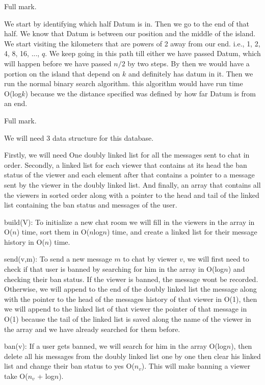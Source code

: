 \documentclass[12pt,twoside]{article}
\begin{document}
\begin{problems}
\begin{problemparts}
\end{problemparts}
\newpage
\problem  %
Full mark.

 We start by identifying which half Datum is in. Then we go to the end of that half. We know that Datum is between our position and the middle of the island. We start visiting the kilometers that are powers of 2 away from our end. i.e., {1, 2, 4, 8, 16, ..., $q$}. We keep going in this path till either we have passed Datum, which will happen before we have passed $n/2$ by two steps. By then we would have a portion on the island that depend on $k$ and definitely has datum in it. Then we run the normal binary search algorithm. this algorithm would have run time O(log$k$) because we the distance specified was defined by how far Datum is from an end.

\problem  %
Full mark.

We will need 3 data structure for this database.

Firstly, we will need One doubly linked list for all the messages sent to chat in order. Secondly, a linked list for each viewer that contains at its head the ban status of the viewer and each element after that contains a pointer to a message sent by the viewer in the doubly linked list. And finally, an array that contains all the viewers in sorted order along with a pointer to the head and tail of the linked list containing the ban status and messages of the user.

build(V): To initialize a new chat room we will fill in the viewers in the array in O($n$) time, sort them in O($n$log$n$) time, and create a linked list for their message history in O($n$) time.
	
 send(v,m): To send a new message $m$ to chat by viewer $v$, we will first need to check if that user is banned by searching for him in the array in O(log$n$) and checking their ban status. If the viewer is banned, the message wont be recorded. Otherwise, we will append to the end of the doubly linked list the message along with the pointer to the head of the messages history of that viewer in O(1), then we will append to the linked list of that viewer the pointer of that message in O(1) because the tail of the linked list is saved along the name of the viewer in the array and we have already searched for them before.

ban(v): If a user gets banned, we will search for him in the array O(log$n$), then delete all his messages from the doubly linked list one by one then clear his linked list and change their ban status to yes O($n_v$). This will make banning a viewer take O($n_v$ + log$n$).


\end{problems}
\end{document}
